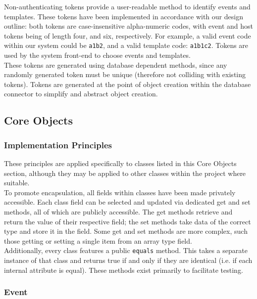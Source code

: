 \documentclass[9pt, titlepage]{extarticle}
\begin{document}
Non-authenticating tokens provide a user-readable method to identify events and templates. 
These tokens have been implemented in accordance with our design outline: 
both tokens are case-insensitive alpha-numeric codes, with event and host tokens being of length four, and six, respectively. For example, a valid event code within our system could be \texttt{a1b2}, and a valid template code: \texttt{a1b1c2}. Tokens are used by the system front-end to choose events and templates. \\

These tokens are generated using database dependent methods, since any randomly generated token must be unique (therefore not colliding with existing tokens). Tokens are generated at the point of object creation within the database connector to simplify and abstract object creation. 

\subsection{Core Objects}

\subsubsection{Implementation Principles}

These principles are applied specifically to classes listed in this Core Objects section, although they may be applied to other classes within the project where suitable.\\

To promote encapsulation, all fields within classes have been made privately accessible. Each class field can be selected and updated via dedicated get and set methods, all of which are publicly accessible. The get methods retrieve and return the value of their respective field; the set methods take data of the correct type and store it in the field. Some get and set methods are more complex, such those getting or setting a single item from an array type field.\\

Additionally, every class features a public \texttt{equals} method. This takes a separate instance of that class and returns true if and only if they are identical (i.e. if each internal attribute is equal). These methods exist primarily to facilitate testing.

\subsubsection{Event}
\end{document}
